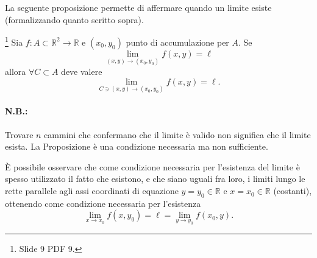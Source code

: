 La seguente proposizione permette di affermare quando un limite esiste (formalizzando quanto scritto sopra).

\begin{proposition}\footnote{Slide 9 PDF 9.}
    Sia $f\colon A\subset\mathbb R^2\rightarrow\mathbb R$ e $(x_0, y_0)$ punto di accumulazione per $A$. Se
    \begin{equation*}
        \lim\limits_{(x,y)\rightarrow(x_0,y_0)} f(x,y)=\ell
    \end{equation*}
    allora $\forall C\subset A$ deve valere
    \begin{equation*}
        \lim\limits_{C\ni(x,y)\rightarrow (x_0,y_0)}f(x, y)=\ell.
    \end{equation*}
\end{proposition}

\paragraph{N.B.:} Trovare $n$ cammini che confermano che il limite è valido non significa che il limite esista. La Proposizione è una condizione necessaria ma non sufficiente.

\begin{remark}
    È  possibile osservare che come condizione necessaria per l'esistenza del limite è spesso utilizzato il fatto che esistono, e che siano uguali fra loro, i limiti lungo le rette parallele agli assi coordinati di equazione $y=y_0\in\mathbb R$ e $x=x_0\in\mathbb R$ (costanti), ottenendo come condizione necessaria per l'esistenza
    \begin{equation*}
        \lim\limits_{x\rightarrow x_0}f(x,y_0)=\ell=\lim\limits_{y\rightarrow y_0}f(x_0, y).
    \end{equation*}
\end{remark}

